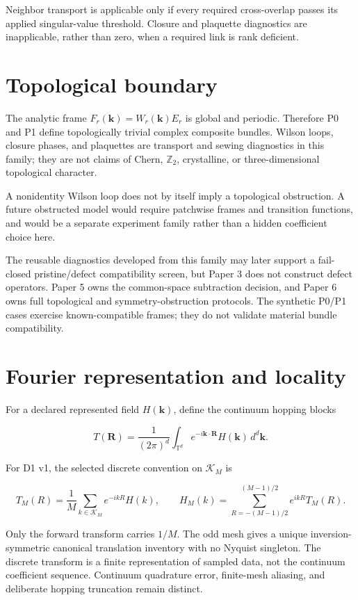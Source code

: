 \documentclass[11pt]{article}
\begin{document}
Neighbor transport is applicable only if every required cross-overlap passes its applied
singular-value threshold. Closure and plaquette diagnostics are inapplicable, rather than
zero, when a required link is rank deficient.

\section{Topological boundary}

The analytic frame $F_r(\mathbf k)=W_r(\mathbf k)E_r$ is global and periodic. Therefore
P0 and P1 define topologically trivial complex composite bundles. Wilson loops, closure
phases, and plaquettes are transport and sewing diagnostics in this family; they are not
claims of Chern, $\mathbb Z_2$, crystalline, or three-dimensional topological character.

A nonidentity Wilson loop does not by itself imply a topological obstruction. A future
obstructed model would require patchwise frames and transition functions, and would be a
separate experiment family rather than a hidden coefficient choice here.

The reusable diagnostics developed from this family may later support a fail-closed
pristine/defect compatibility screen, but Paper 3 does not construct defect operators.
Paper 5 owns the common-space subtraction decision, and Paper 6 owns full topological
and symmetry-obstruction protocols. The synthetic P0/P1 cases exercise known-compatible
frames; they do not validate material bundle compatibility.

\section{Fourier representation and locality}

For a declared represented field $H(\mathbf k)$, define the continuum hopping blocks

\[
T(\mathbf R)=\frac{1}{(2\pi)^d}
\int_{\mathbb T^d}e^{-i\mathbf k\cdot\mathbf R}
H(\mathbf k)\,d^d\mathbf k.
\]

For D1 v1, the selected discrete convention on $\mathcal K_M$ is

\[
T_M(R)=\frac1M\sum_{k\in\mathcal K_M}e^{-ikR}H(k),
\qquad
H_M(k)=\sum_{R=-(M-1)/2}^{(M-1)/2}e^{ikR}T_M(R).
\]

Only the forward transform carries $1/M$. The odd mesh gives a unique inversion-symmetric
canonical translation inventory with no Nyquist singleton. The discrete transform is a
finite representation of sampled data, not the continuum coefficient sequence.
Continuum quadrature error, finite-mesh aliasing, and deliberate hopping truncation
remain distinct.
\end{document}
